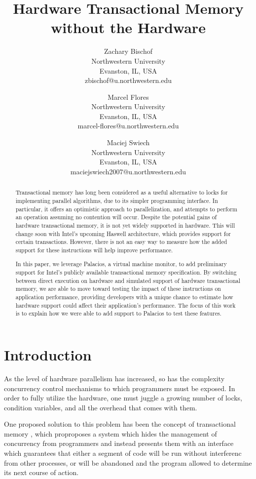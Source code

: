 \documentclass{acm_proc_article-sp}
\title{Hardware Transactional Memory without the Hardware}
\author{Zachary Bischof \\
	Northwestern University\\
	Evanston, IL, USA\\
	zbischof@u.northwestern.edu
	\and 
	Marcel Flores \\
	Northwestern University\\
	Evanston, IL, USA\\
	marcel-flores@u.northwestern.edu
	\and
	Maciej Swiech \\
	Northwestern University\\
	Evanston, IL, USA\\
	maciejswiech2007@u.northwestern.edu
	}
\begin{document}
\maketitle

\begin{abstract} 

Transactional memory has long been considered as a useful alternative to locks
for implementing parallel algorithms, due to its simpler programming interface.
In particular, it offers an optimistic approach to parallelization, and
attempts to perform an operation assuming no contention will occur. Despite the
potential gains of hardware transactional memory, it is not yet widely
supported in hardware. This will change soon with Intel's upcoming Haswell
architecture, which provides support for certain transactions. However, there
is not an easy way to measure how the added support for these instructions will
help improve performance.

In this paper, we leverage Palacios, a virtual machine monitor, to add
preliminary support for Intel's publicly available transactional memory
specification. By switching between direct execution on hardware and simulated
support of hardware transactional memory, we are able to move toward testing the impact of
these instructions on application performance, providing developers with a
unique chance to estimate how hardware support could affect their application's
performance. The focus of this work is to explain how we were able to add
support to Palacios to test these features.


\end{abstract}

\section{Introduction}
As the level of hardware parallelism has increased, so has the complexity 
concurrency control mechanisms to which programmers must be exposed. In order
to fully utilize the hardware, one must juggle a growing number of locks,
condition variables, and all the overhead that comes with them.

One proposed solution to this problem has been the concept of transactional
memory \cite{Herlihy:1993:TMA:173682.165164}, which proproposes a system
which hides the management of concurrency from programmers and instead
presents them with an interface which guarantees that either a segment of
code will be run without interferenc from other processes, or will be
abandoned and the program allowed to determine its next course of action.
 
\end{document}
